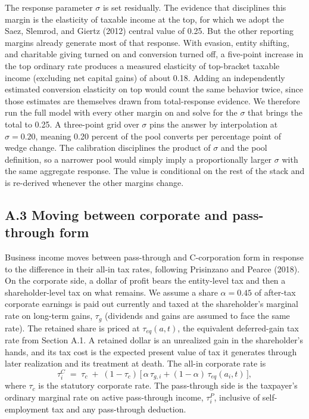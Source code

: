 \documentclass[10pt,twocolumn]{article}
\begin{document}
The response parameter $\sigma$ is set residually. The evidence that
disciplines this margin is the elasticity of taxable income at the top, for
which we adopt the Saez, Slemrod, and Giertz (2012) central value of 0.25. But
the other reporting margins already generate most of that response. With
evasion, entity shifting, and charitable giving turned on and conversion
turned off, a five-point increase in the top ordinary rate produces a measured
elasticity of top-bracket taxable income (excluding net capital gains) of
about 0.18. Adding an independently estimated conversion elasticity on top
would count the same behavior twice, since those estimates are themselves
drawn from total-response evidence. We therefore run the full model with every
other margin on and solve for the $\sigma$ that brings the total to 0.25.
A three-point grid over $\sigma$ pins the answer by interpolation
at $\sigma = 0.20$, meaning 0.20 percent of the pool converts per percentage
point of wedge change. The calibration
disciplines the product of $\sigma$ and the pool definition, so a narrower
pool would simply imply a proportionally larger $\sigma$ with the same
aggregate response. The value is conditional on the rest of the stack and is
re-derived whenever the other margins change.

\subsection*{A.3 Moving between corporate and pass-through form}

Business income moves between pass-through and C-corporation form in response
to the difference in their all-in tax rates, following Prisinzano and Pearce
(2018). On the corporate side, a dollar of profit bears the entity-level tax
and then a shareholder-level tax on what remains. We assume a share
$\alpha = 0.45$ of after-tax corporate earnings is paid out currently and
taxed at the shareholder's marginal rate on long-term gains, $\tau_g$
(dividends and gains are assumed to face the same rate). The retained share is
priced at $\tau_{eq}(a,t)$, the equivalent deferred-gain tax rate from Section
A.1. A retained dollar is an unrealized gain in the shareholder's hands, and
its tax cost is the expected present value of tax it generates through later
realization and its treatment at death. The all-in corporate rate is
\begin{equation*}
\tau^{C}_i \;=\; \tau_c \;+\; (1-\tau_c)\,\big[\,\alpha\,\tau_{g,i} + (1-\alpha)\,\tau_{eq}(a_i,t)\,\big],
\end{equation*}
where $\tau_c$ is the statutory corporate rate. The pass-through side is the
taxpayer's ordinary marginal rate on active pass-through income, $\tau^{P}_i$,
inclusive of self-employment tax and any pass-through deduction.
\end{document}
